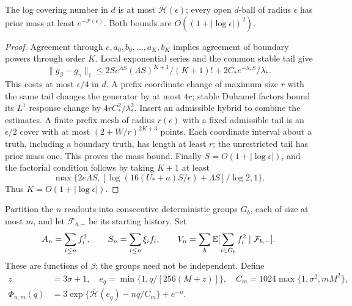 \begin{lemma}
\label{lem:entropy}
The log covering number in $d$ is at most $\overline{\mathcal H}(\epsilon)$;
every open $d$-ball of radius $\epsilon$ has prior mass at least
$e^{-\mathcal P(\epsilon)}$. Both bounds are $O((1+|\log\epsilon|)^2)$.
\end{lemma}
\begin{proof}
Agreement through $c,a_0,b_0,\ldots,a_K,b_K$ implies agreement of boundary
powers through order $K$. Local exponential series and the common stable tail give
\[
 \|g_\beta-g_\gamma\|_1\le
 2S e^{\Lambda S}(\Lambda S)^{K+1}/(K+1)!+
 2C_*e^{-\lambda_*S}/\lambda_*.
\]
This costs at most $\epsilon/4$ in $d$. A prefix coordinate change of maximum
size $r$ with the same tail changes the generator by at most $4r$; stable
Duhamel factors bound its $L^1$ response change by $4rC_*^2/\lambda_*^2$.
Insert an admissible hybrid to combine the estimates. A finite prefix mesh
of radius $r(\epsilon)$ with a fixed admissible tail is an $\epsilon/2$ cover
with at most $(2+W/r)^{2K+3}$ points. Each coordinate interval about a truth,
including a boundary truth, has length at least $r$; the unrestricted tail has
prior mass one. This proves the mass bound. Finally $S=O(1+|\log\epsilon|)$,
and the factorial condition follows by taking $K+1$ at least
\[
 \max\{2e\Lambda S,
 [\log(16(U_*+a)S/\epsilon)+\Lambda S]/\log2,1\}.
\]
Thus $K=O(1+|\log\epsilon|)$.
\end{proof}

Partition the $n$ readouts into consecutive deterministic groups $G_b$, each
of size at most $m$, and let $\mathcal F_{b,-}$ be its starting history. Set
\[
 A_n=\sum_{i\le n}f_i^2,\qquad S_n=\sum_{i\le n}\xi_i f_i,\qquad
 V_n=\sum_b\mathbb E[\sum_{i\in G_b}f_i^2\mid\mathcal F_{b,-}].
\]
These are functions of $\beta$; the groups need not be independent. Define
\begin{equation}
 \begin{split}
 z&=3\sigma+1,\quad e_q=\min\{1,q/[256(M+z)]\},\quad
 C_m=1024\max\{1,\sigma^2,mM^2\},\\
 \Phi_{n,m}(q)&=3\exp\{\overline{\mathcal H}(e_q)-nq/C_m\}+e^{-n}.
 \end{split}\label{eq:variance-tail}
\end{equation}

